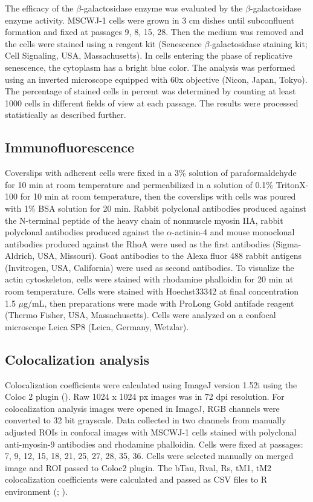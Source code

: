\documentclass[alpha-refs]{wiley-article}
\begin{document}
The efficacy of the $\beta$-galactosidase enzyme was evaluated by the $\beta$-galactosidase enzyme activity.
MSCWJ-1 cells were grown in 3 cm dishes until subconfluent formation and fixed at passages 9, 8, 15, 28.
Then the medium was removed and the cells were stained using a reagent kit (Senescence $\beta$-galactosidase staining kit; Cell Signaling, USA, Massachusetts).
In cells entering the phase of replicative senescence, the cytoplasm has a bright blue color.
The analysis was performed using an inverted microscope equipped with 60x objective (Nicon, Japan, Tokyo).
The percentage of stained cells in percent was determined by counting at least 1000 cells in different fields of view at each passage.
The results were processed statistically as described further.

\subsection{Immunofluorescence}

Coverslips with adherent cells were fixed in a 3\% solution of paraformaldehyde for 10 min at room temperature and permeabilized in a solution of 0.1\% TritonX-100 for 10 min at room temperature, then the coverslips with cells was poured with 1\% BSA solution for 20 min.
Rabbit polyclonal antibodies produced against the N-terminal peptide of the heavy chain of nonmuscle myosin IIA, rabbit polyclonal antibodies produced against the $\alpha$-actinin-4 and mouse monoclonal antibodies produced against the RhoA were used as the first antibodies (Sigma-Aldrich, USA, Missouri).
Goat antibodies to the Alexa fluor 488 rabbit antigens (Invitrogen, USA, California) were used as second antibodies.
To visualize the actin cytoskeleton, cells were stained with rhodamine phalloidin for 20 min at room temperature.
Cells were stained with Hoechst33342 at final concentration 1.5 $\mu$g/mL, then preparations were made with ProLong Gold antifade reagent (Thermo Fisher, USA, Massachusetts).
Cells were analyzed on a confocal microscope Leica SP8 (Leica, Germany, Wetzlar).

\subsection{Colocalization analysis}

Colocalization coefficients were calculated using ImageJ version 1.52i using the Coloc 2 plugin (\cite{rueden2017imagej2}).
Raw 1024 x 1024 px images was in 72 dpi resolution.
For colocalization analysis images were opened in ImageJ, RGB channels were converted to 32 bit grayscale.
Data collected in two channels from manually adjusted ROIs in confocal images with MSCWJ-1 cells stained with polyclonal anti-myosin-9 antibodies and rhodamine phalloidin. Cells were fixed at passages: 7, 9, 12, 15, 18, 21, 25, 27, 28, 35, 36.
Cells were selected manually on merged image and ROI passed to Coloc2 plugin.
The bTau, Rval, Rs, tM1, tM2 colocalization coefficients were calculated and passed as CSV files to R environment (\cite{adler2008replicate}; \cite{bergholm2010analysis}).
\end{document}
